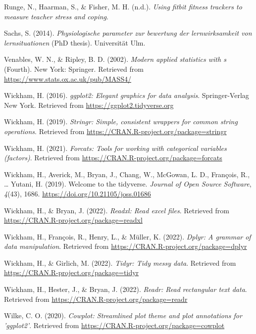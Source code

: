 \documentclass[
  man]{apa6}
\newlength{\cslhangindent}
\newlength{\cslentryspacingunit} %
\newenvironment{CSLReferences}[2] %
 {%
  \setlength{\parindent}{0pt}
  \ifodd #1
  \let\oldpar\par
  \def\par{\hangindent=\cslhangindent\oldpar}
  \fi
  \setlength{\parskip}{#2\cslentryspacingunit}
 }%
 {}
\begin{document}
\begin{CSLReferences}{1}{0}
\leavevmode{}%
Runge, N., Haarman, S., \& Fisher, M. H. (n.d.). \emph{Using fitbit fitness trackers to measure teacher stress and coping}.

\leavevmode{}%
Sachs, S. (2014). \emph{Physiologische parameter zur bewertung der lernwirksamkeit von lernsituationen} (PhD thesis). Universit{ä}t Ulm.

\leavevmode{}%
Venables, W. N., \& Ripley, B. D. (2002). \emph{Modern applied statistics with s} (Fourth). New York: Springer. Retrieved from \url{https://www.stats.ox.ac.uk/pub/MASS4/}

\leavevmode{}%
Wickham, H. (2016). \emph{ggplot2: Elegant graphics for data analysis}. Springer-Verlag New York. Retrieved from \url{https://ggplot2.tidyverse.org}

\leavevmode{}%
Wickham, H. (2019). \emph{Stringr: Simple, consistent wrappers for common string operations}. Retrieved from \url{https://CRAN.R-project.org/package=stringr}

\leavevmode{}%
Wickham, H. (2021). \emph{Forcats: Tools for working with categorical variables (factors)}. Retrieved from \url{https://CRAN.R-project.org/package=forcats}

\leavevmode{}%
Wickham, H., Averick, M., Bryan, J., Chang, W., McGowan, L. D., François, R., \ldots{} Yutani, H. (2019). Welcome to the {tidyverse}. \emph{Journal of Open Source Software}, \emph{4}(43), 1686. \url{https://doi.org/10.21105/joss.01686}

\leavevmode{}%
Wickham, H., \& Bryan, J. (2022). \emph{Readxl: Read excel files}. Retrieved from \url{https://CRAN.R-project.org/package=readxl}

\leavevmode{}%
Wickham, H., François, R., Henry, L., \& Müller, K. (2022). \emph{Dplyr: A grammar of data manipulation}. Retrieved from \url{https://CRAN.R-project.org/package=dplyr}

\leavevmode{}%
Wickham, H., \& Girlich, M. (2022). \emph{Tidyr: Tidy messy data}. Retrieved from \url{https://CRAN.R-project.org/package=tidyr}

\leavevmode{}%
Wickham, H., Hester, J., \& Bryan, J. (2022). \emph{Readr: Read rectangular text data}. Retrieved from \url{https://CRAN.R-project.org/package=readr}

\leavevmode{}%
Wilke, C. O. (2020). \emph{Cowplot: Streamlined plot theme and plot annotations for 'ggplot2'}. Retrieved from \url{https://CRAN.R-project.org/package=cowplot}

\end{CSLReferences}
\end{document}
